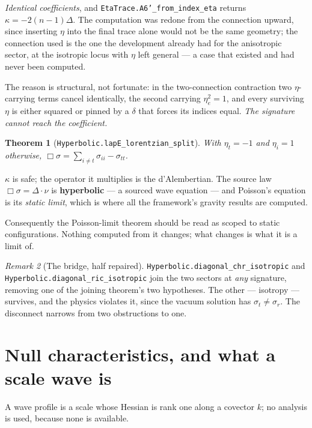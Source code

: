 \documentclass[11pt,a4paper]{article}
\newtheorem{theorem}{Theorem}[section]
\theoremstyle{definition}
\theoremstyle{remark}
\newtheorem{remark}[theorem]{Remark}
\newcommand{\lean}[1]{\texttt{\small #1}}
\newcommand{\sg}{\sigma}
\begin{document}
\emph{Identical coefficients}, and \lean{EtaTrace.A6'\_from\_index\_eta} returns
$\kappa=-2(n-1)\Delta$. The computation was redone from the connection upward,
since inserting $\eta$ into the final trace alone would not be the same geometry;
the connection used is the one the development already had for the anisotropic
sector, at the isotropic locus with $\eta$ left general --- a case that existed and
had never been computed.

The reason is structural, not fortunate: in the two-connection contraction two
$\eta$-carrying terms cancel identically, the second carrying $\eta_e^{2}=1$, and
every surviving $\eta$ is either squared or pinned by a $\delta$ that forces its
indices equal. \emph{The signature cannot reach the coefficient.}

\begin{theorem}[\lean{Hyperbolic.lapE\_lorentzian\_split}]
With $\eta_t=-1$ and $\eta_i=1$ otherwise,
$\Box\sg=\sum_{i\neq t}\sg_{ii}-\sg_{tt}$.
\end{theorem}

\begin{claimbox}
$\kappa$ is safe; the operator it multiplies is the d'Alembertian. The source law
$\Box\sg=\Delta\cdot\nu$ is \textbf{hyperbolic} --- a sourced wave equation --- and
Poisson's equation is its \emph{static limit}, which is where all the framework's
gravity results are computed.
\end{claimbox}

Consequently the Poisson-limit theorem should be read as scoped to static
configurations. Nothing computed from it changes; what changes is what it is a
limit of.

\begin{remark}[The bridge, half repaired]
\lean{Hyperbolic.diagonal\_chr\_isotropic} and
\lean{Hyperbolic.diagonal\_ric\_isotropic} join the two sectors at \emph{any}
signature, removing one of the joining theorem's two hypotheses. The other ---
isotropy --- survives, and the physics violates it, since the vacuum solution has
$\sg_t\neq\sg_r$. The disconnect narrows from two obstructions to one.
\end{remark}

\section{Null characteristics, and what a scale wave is}
\label{sec:waves}

A wave profile is a scale whose Hessian is rank one along a covector $k$; no
analysis is used, because none is available.
\end{document}
